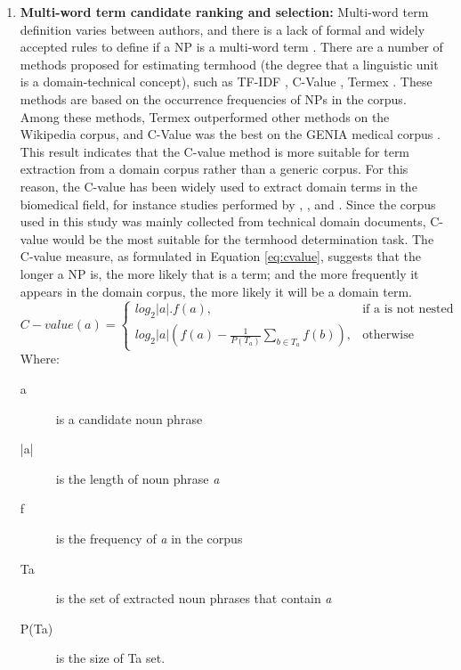 \documentclass[Journal,InsideFigs, DoubleSpace]{ascelike} %
\begin{document}
\begin{enumerate} [label=\roman*]
\begin{itemize}
		\item \textbf{Type 2} - Preposition noun phrases, for example `roadway type' and `type of roadway'. In order to normalize this type of variant, the form with preposition is converted into the non-preposition form by removing the preposition and reversing the order of the remaining portions. For instance, `type of roadway' will become `roadway type'.
	\end{itemize}
	Since NPs with low occurrence frequencies that are unlikely to be technical terms should be automatically eliminated. With the frequency threshold of 2, the list consists of 112,024  terms. The list size drops to 8,922 when a threshold of 50 is used. In this research we used a threshold of 50.
	\item \textbf{Multi-word term candidate ranking and selection:} Multi-word term definition varies between authors, and there is a lack of formal and widely accepted rules to define if a NP is a multi-word term \cite{frantzi20}. There are a number of methods proposed for estimating termhood (the degree that a linguistic unit is a domain-technical concept), such as TF-IDF  \cite{sparck72,salton88}, C-Value \cite{frantzi20}, Termex  \cite{sclano07}. These methods are based on the occurrence frequencies of NPs in the corpus. Among these methods, Termex outperformed other methods on the Wikipedia corpus, and C-Value was the best on the GENIA medical corpus \cite{zhang08}. This result indicates that the C-value method is more suitable for term extraction from a domain corpus rather than a generic corpus. For this reason, the C-value has been widely used to extract domain terms in the biomedical field, for instance studies performed by , , and . Since the corpus used in this study was mainly collected from technical domain documents, C-value would be the most suitable for the termhood determination task. The C-value measure, as formulated in Equation \ref{eq:cvalue}, suggests that the longer a NP is, the more likely that is a term; and the more frequently it appears in the domain corpus, the more likely it will be a domain term.
	\begin{equation}
	C-value(a)=
	\begin{cases}
	log_2|a|.f(a), & \text{if a is not nested} \\
	log_2|a|(f(a)-\frac{1}{P(T_a)}\sum_{b\in T_a} f(b)), & \text{otherwise}
	\end{cases}
	\label{eq:cvalue}
	\end{equation}
	Where:
	\begin{description}
		\item[a] is a candidate noun phrase
		\item[|a|] is the length of noun phrase \textit{a}
		\item[f] is the frequency of \textit{a} in the corpus
		\item[Ta] is the set of extracted noun phrases that contain \textit{a}
		\item[P(Ta)] is the size of Ta set.
	\end{description}
\end{enumerate}
\end{document}
